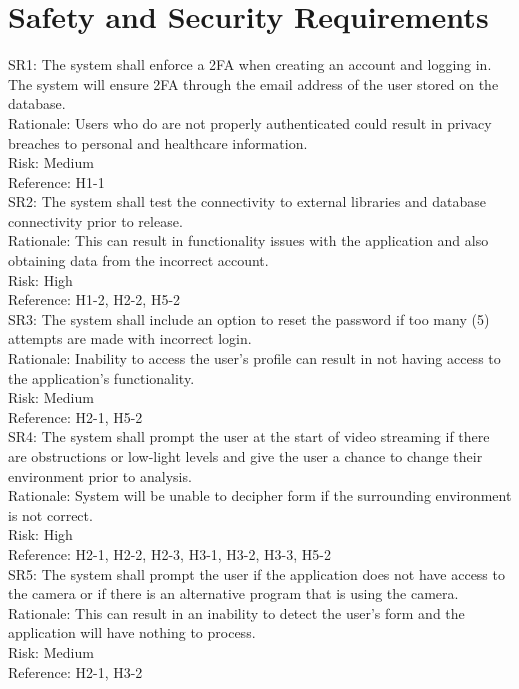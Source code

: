\documentclass{article}
\begin{document}
\section{Safety and Security Requirements}

SR1: The system shall enforce a 2FA when creating an account and logging in. The system will ensure 2FA through the email address of the user stored on the database.\\
Rationale: Users who do are not properly authenticated could result in privacy breaches to personal and healthcare information.\\
Risk: Medium \\
Reference: H1-1\\


\noindent
SR2: The system shall test the connectivity to external libraries and database connectivity prior to release.\\
Rationale: This can result in functionality issues with the application and also obtaining data from the incorrect account.\\
Risk: High\\
Reference: H1-2, H2-2, H5-2\\


\noindent
SR3: The system shall include an option to reset the password if too many (5) attempts are made with incorrect login.\\
Rationale: Inability to access the user's profile can result in not having access to the application's functionality.\\
Risk: Medium\\
Reference: H2-1, H5-2\\


\noindent
SR4: The system shall prompt the user at the start of video streaming if there are obstructions or low-light levels and give the user a chance to change their environment prior to analysis.\\
Rationale: System will be unable to decipher form if the surrounding environment is not correct.\\
Risk: High\\
Reference: H2-1, H2-2, H2-3, H3-1, H3-2, H3-3, H5-2\\


\noindent
SR5: The system shall prompt the user if the application does not have access to the camera or if there is an alternative program that is using the camera.\\
Rationale: This can result in an inability to detect the user's form and the application will have nothing to process.\\
Risk: Medium\\
Reference: H2-1, H3-2\\
\end{document}
